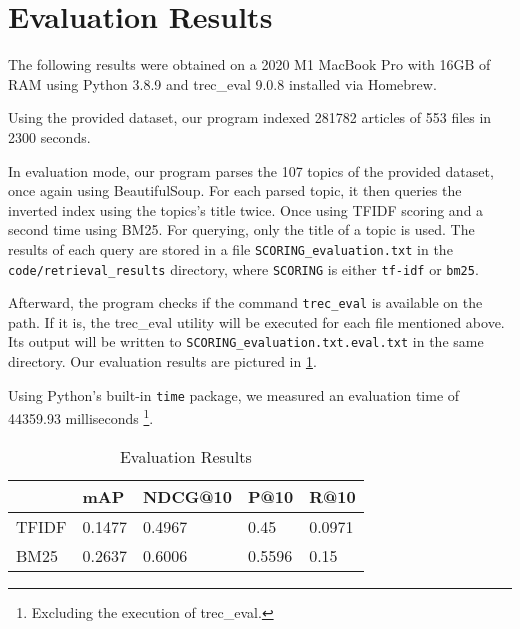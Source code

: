 \section{Evaluation Results}
\label{sec:results}

The following results were obtained on a 2020 M1 MacBook Pro with 16GB of RAM using Python 3.8.9 and trec\_eval 9.0.8 installed via Homebrew.

\medskip

Using the provided dataset, our program indexed 281782 articles of 553 files in 2300 seconds.

\medskip

In evaluation mode, our program parses the 107 topics of the provided dataset, once again using BeautifulSoup.
For each parsed topic, it then queries the inverted index using the topics's title twice.
Once using TFIDF scoring and a second time using BM25.
For querying, only the title of a topic is used.
The results of each query are stored in a file \verb|SCORING_evaluation.txt| in the \verb|code/retrieval_results| directory, where \verb|SCORING| is either \verb|tf-idf| or \verb|bm25|.

Afterward, the program checks if the command \verb|trec_eval| is available on the path.
If it is, the trec\_eval utility will be executed for each file mentioned above.
Its output will be written to \verb|SCORING_evaluation.txt.eval.txt| in the same directory.
Our evaluation results are pictured in \cref{table:results}.

Using Python's built-in \verb|time| package, we measured an evaluation time of 44359.93 milliseconds \footnote{Excluding the execution of trec\_eval.}.

\begin{table}[]
\center
\begin{tabular}{|l|l|l|l|l|}
	\hline
	      & mAP    & NDCG@10 & P@10   & R@10   \\
	\hline
	TFIDF & 0.1477 & 0.4967  & 0.45   & 0.0971 \\
	\hline
	BM25  & 0.2637 & 0.6006  & 0.5596 & 0.15   \\
	\hline
\end{tabular}
\caption{Evaluation Results}
\label{table:results}
\end{table}

